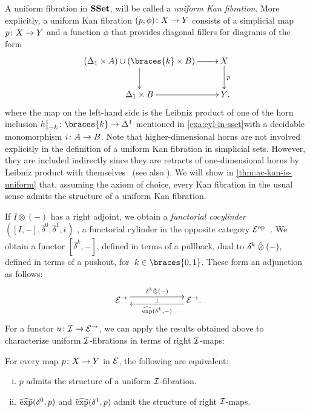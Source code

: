 \documentclass[reqno,10pt,a4paper,oneside,draft]{amsart}
\begin{document}
\begin{example}
A uniform fibration in $\SSet$, will be called a \emph{uniform Kan fibration}.
More explicitly, a uniform Kan fibration $(p, \phi) \co X \to Y$ consists of a simplicial map
$p \co X \to Y$ and a function $\phi$ that provides diagonal fillers for diagrams of the form
\[
\xymatrix{
  (\Delta_1 \times A) \cup (\braces{k} \times B)
  \ar[r]
  \ar[d]
&
  X
  \ar[d]^{p}
\\
  \Delta_1 \times B
  \ar[r]
&
  Y
\rlap{.}}
\]
where the map on the left-hand side is the Leibniz product of one of the horn inclusion $h_{1-k}^1 \co \braces{k} \to \Delta^1$ mentioned in \cref{exa:cyl-in-sset}with a decidable monomorphism $i \co A \to B$.
Note that higher-dimensional horns are not involved explicitly in the definition of a uniform Kan fibration in simplicial sets.
However, they are included indirectly since they are retracts of one-dimensional horns by Leibniz product with themselves~\cite{joyal-quaderns} (see also \cite[Proposition 2.1.2.6]{lurie:htt}).
We will show in \cref{thm:ac-kan-is-uniform} that, assuming the axiom of choice, every Kan fibration in the usual sense admits the structure of a uniform Kan fibration.
\end{example}

\begin{example}
\end{example}

\medskip

If $I \otimes (-)$ has a right adjoint, we obtain a \emph{functorial cocylinder} $([I, -], \overline{\delta}^0, \overline{\delta}^1, \overline{\epsilon})$ , \ie a functorial cylinder in the opposite category $\catE^{\op}$~\cite{kamps-porter:homotopy}.
We obtain a functor $[\overline{\delta}^k, -]$, defined in terms of a pullback, dual to $\kcyl \hatotimes (-)$, defined in terms of a pushout, for~$k \in \braces{0, 1}$.
These form an adjunction as follows:
\[
\xymatrix@C+4em{
  \cal{E}^\to \ar@<1ex>[r]^{\kcyl \hatotimes (-)} \ar@{}[r]|{\bot} &
  \cal{E}^\to \rlap{.} \ar@<1ex>[l]^{\hatexp(\kcyl, -)}
}
\]
For a functor $u \co \cal{I} \to \cal{E}^\to$, we can apply the results obtained above to characterize uniform $\cal{I}$-fibrations in terms of right $\cal{I}$-maps:

\begin{proposition} \label{prod-exp-general}
For every map $p \co X \to Y$ in $\cal{E}$, the following are equivalent:
\begin{enumerate}[(i)]
\item $p$ admits the structure of a uniform $\cal{I}$-fibration.
\item $\hatexp(\lcyl, p)$ and $\hatexp(\rcyl, p)$ admit the structure of right $\cal{I}$-maps.
\end{enumerate}
\end{proposition}
\end{document}
